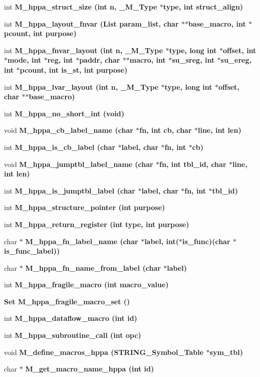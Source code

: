 \begin{CompactItemize}
\item 
int \bf{M\_\-hppa\_\-struct\_\-size} (int n, \bf{\_\-M\_\-Type} $\ast$type, int struct\_\-align)
\item 
int \bf{M\_\-hppa\_\-layout\_\-fnvar} (\bf{List} param\_\-list, char $\ast$$\ast$base\_\-macro, int $\ast$pcount, int purpose)
\item 
int \bf{M\_\-hppa\_\-fnvar\_\-layout} (int n, \bf{\_\-M\_\-Type} $\ast$type, long int $\ast$offset, int $\ast$\bf{mode}, int $\ast$reg, int $\ast$paddr, char $\ast$$\ast$macro, int $\ast$su\_\-sreg, int $\ast$su\_\-ereg, int $\ast$pcount, int is\_\-st, int purpose)
\item 
int \bf{M\_\-hppa\_\-lvar\_\-layout} (int n, \bf{\_\-M\_\-Type} $\ast$type, long int $\ast$offset, char $\ast$$\ast$base\_\-macro)
\item 
int \bf{M\_\-hppa\_\-no\_\-short\_\-int} (void)
\item 
void \bf{M\_\-hppa\_\-cb\_\-label\_\-name} (char $\ast$fn, int cb, char $\ast$line, int len)
\item 
int \bf{M\_\-hppa\_\-is\_\-cb\_\-label} (char $\ast$label, char $\ast$fn, int $\ast$cb)
\item 
void \bf{M\_\-hppa\_\-jumptbl\_\-label\_\-name} (char $\ast$fn, int tbl\_\-id, char $\ast$line, int len)
\item 
int \bf{M\_\-hppa\_\-is\_\-jumptbl\_\-label} (char $\ast$label, char $\ast$fn, int $\ast$tbl\_\-id)
\item 
int \bf{M\_\-hppa\_\-structure\_\-pointer} (int purpose)
\item 
int \bf{M\_\-hppa\_\-return\_\-register} (int type, int purpose)
\item 
char $\ast$ \bf{M\_\-hppa\_\-fn\_\-label\_\-name} (char $\ast$label, int($\ast$is\_\-func)(char $\ast$is\_\-func\_\-label))
\item 
char $\ast$ \bf{M\_\-hppa\_\-fn\_\-name\_\-from\_\-label} (char $\ast$label)
\item 
int \bf{M\_\-hppa\_\-fragile\_\-macro} (int macro\_\-value)
\item 
\bf{Set} \bf{M\_\-hppa\_\-fragile\_\-macro\_\-set} ()
\item 
int \bf{M\_\-hppa\_\-dataflow\_\-macro} (int id)
\item 
int \bf{M\_\-hppa\_\-subroutine\_\-call} (int opc)
\item 
void \bf{M\_\-define\_\-macros\_\-hppa} (\bf{STRING\_\-Symbol\_\-Table} $\ast$sym\_\-tbl)
\item 
char $\ast$ \bf{M\_\-get\_\-macro\_\-name\_\-hppa} (int id)
$$
\end{CompactItemize}
